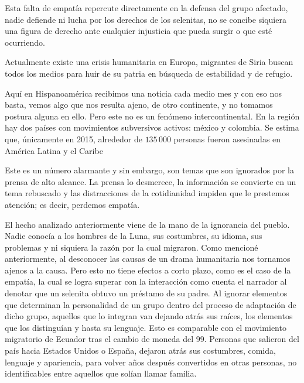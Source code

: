\documentclass[a3paper]{tufte-handout}
\begin{document}
   Esta falta de empatía repercute directamente en la defensa del grupo afectado, nadie defiende ni lucha por los derechos de los selenitas, no se concibe siquiera una figura de derecho ante cualquier injusticia que pueda surgir o que esté ocurriendo.
   
 Actualmente existe una crisis humanitaria en Europa, migrantes de Siria buscan todos los medios para huir de su patria en búsqueda de estabilidad y de refugio.
    
    
 Aquí en Hispanoamérica recibimos una noticia cada medio mes y con eso nos basta, vemos algo que nos resulta ajeno, de otro continente, y no tomamos postura alguna en ello. Pero este no es un fenómeno intercontinental. En la región hay dos países con movimientos subversivos activos: méxico y colombia. Se estima que, únicamente en 2015, alrededor de \(135\, 000\) personas fueron asesinadas en América Latina y el Caribe \cite{Ruben}
 
 
Este es un número alarmante y sin embargo, son temas que son ignorados por la prensa de alto alcance. La prensa lo desmerece, la información se convierte en un tema rebuscado y las distracciones de la cotidianidad impiden que le prestemos atención; es decir, perdemos empatía.



\begin{multicols}{4} 
El hecho analizado anteriormente viene de la mano de la ignorancia del pueblo. Nadie conocía a los hombres de la Luna, sus costumbres, su idioma, sus problemas y ni siquiera la razón por la cual migraron. Como mencioné anteriormente, al desconocer las causas de un drama humanitaria nos tornamos ajenos a la causa. Pero esto no tiene efectos a corto plazo, como es el caso de la empatía, la cual se logra superar con la interacción como cuenta el narrador al denotar que un selenita obtuvo un préstamo de su padre. Al ignorar elementos que determinan la personalidad de un grupo dentro del proceso de adaptación de dicho grupo, aquellos que lo integran van dejando atrás sus raíces, los elementos que los distinguían y hasta su lenguaje. Esto es comparable con el movimiento migratorio de Ecuador tras el cambio de moneda del 99. Personas que salieron del país hacia Estados Unidos o España, dejaron atrás sus costumbres, comida, lenguaje y apariencia, para volver años después convertidos en otras personas, no identificables entre aquellos que solían llamar familia. 
 \end{multicols}
 
\end{document}
